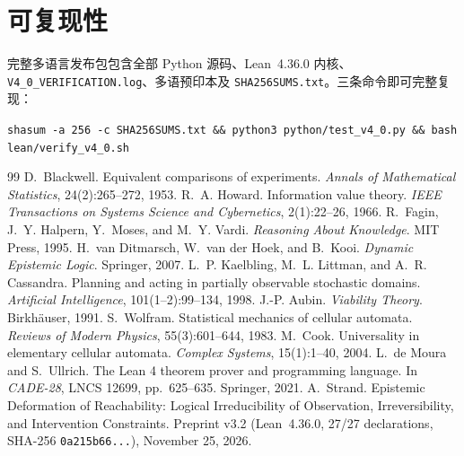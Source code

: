 \documentclass[10pt,a4paper]{article}
\newcommand{\code}[1]{\nolinkurl{#1}}
\begin{document}
\section{可复现性}

完整多语言发布包包含全部 Python 源码、Lean~4.36.0 内核、\code{V4_0_VERIFICATION.log}、多语预印本及 \code{SHA256SUMS.txt}。三条命令即可完整复现：
\begin{center}
\small\texttt{shasum -a 256 -c SHA256SUMS.txt \&\& python3 python/test\_v4\_0.py \&\& bash lean/verify\_v4\_0.sh}
\end{center}

\begin{thebibliography}{99}
\small
{} D.~Blackwell. Equivalent comparisons of experiments. \emph{Annals of Mathematical Statistics}, 24(2):265--272, 1953.
 R.~A. Howard. Information value theory. \emph{IEEE Transactions on Systems Science and Cybernetics}, 2(1):22--26, 1966.
 R.~Fagin, J.~Y. Halpern, Y.~Moses, and M.~Y. Vardi. \emph{Reasoning About Knowledge}. MIT Press, 1995.
 H.~van Ditmarsch, W.~van der Hoek, and B.~Kooi. \emph{Dynamic Epistemic Logic}. Springer, 2007.
 L.~P. Kaelbling, M.~L. Littman, and A.~R. Cassandra. Planning and acting in partially observable stochastic domains. \emph{Artificial Intelligence}, 101(1--2):99--134, 1998.
 J.-P. Aubin. \emph{Viability Theory}. Birkh\"auser, 1991.
 S.~Wolfram. Statistical mechanics of cellular automata. \emph{Reviews of Modern Physics}, 55(3):601--644, 1983.
 M.~Cook. Universality in elementary cellular automata. \emph{Complex Systems}, 15(1):1--40, 2004.
 L.~de Moura and S.~Ullrich. The Lean 4 theorem prover and programming language. In \emph{CADE-28}, LNCS 12699, pp.~625--635. Springer, 2021.
 A.~Strand. Epistemic Deformation of Reachability: Logical Irreducibility of Observation, Irreversibility, and Intervention Constraints. Preprint v3.2 (Lean~4.36.0, 27/27 declarations, SHA-256 \code{0a215b66...}), November 25, 2026.
\end{thebibliography}
\end{document}

